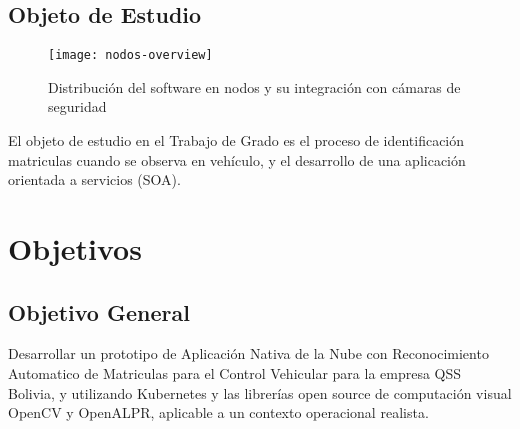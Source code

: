     \subsection{Objeto de Estudio}
        \begin{figure}[H]
            \centering
            \texttt{[image: nodos-overview]}
            \caption{Distribución del software en nodos y su integración con cámaras de seguridad}
            \label{fig:components-abstract}
        \end{figure}
        El objeto de estudio en el Trabajo de Grado es el proceso de identificación matriculas cuando se observa en vehículo, y el desarrollo de una aplicación orientada a servicios (SOA).

\section{Objetivos}

    \subsection{Objetivo General}
    Desarrollar un prototipo de Aplicación Nativa de la Nube con Reconocimiento Automatico de Matriculas para el Control Vehicular para la empresa QSS Bolivia, y utilizando Kubernetes y las librerías open source de computación visual OpenCV  y OpenALPR, aplicable a un contexto operacional realista.
